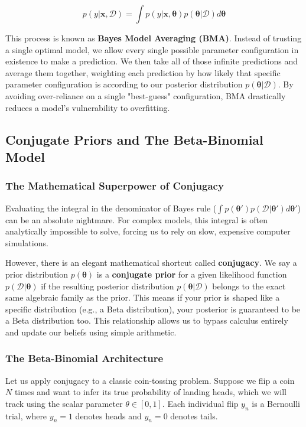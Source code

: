 \documentclass{article}
\begin{document}
\begin{equation}
p(y|\mathbf{x}, \mathcal{D}) = \int p(y|\mathbf{x}, \boldsymbol{\theta})p(\boldsymbol{\theta}|\mathcal{D})d\boldsymbol{\theta}
\end{equation}

This process is known as \textbf{Bayes Model Averaging (BMA)}. Instead of trusting a single optimal model, we allow every single possible parameter configuration in existence to make a prediction. We then take all of those infinite predictions and average them together, weighting each prediction by how likely that specific parameter configuration is according to our posterior distribution $p(\boldsymbol{\theta}|\mathcal{D})$. By avoiding over-reliance on a single "best-guess" configuration, BMA drastically reduces a model's vulnerability to overfitting.

\subsection{Conjugate Priors and The Beta-Binomial Model}

\subsubsection{The Mathematical Superpower of Conjugacy}
Evaluating the integral in the denominator of Bayes rule ($\int p(\boldsymbol{\theta}')p(\mathcal{D}|\boldsymbol{\theta}')d\boldsymbol{\theta}'$) can be an absolute nightmare. For complex models, this integral is often analytically impossible to solve, forcing us to rely on slow, expensive computer simulations.

However, there is an elegant mathematical shortcut called \textbf{conjugacy}. We say a prior distribution $p(\boldsymbol{\theta})$ is a \textbf{conjugate prior} for a given likelihood function $p(\mathcal{D}|\boldsymbol{\theta})$ if the resulting posterior distribution $p(\boldsymbol{\theta}|\mathcal{D})$ belongs to the exact same algebraic family as the prior. This means if your prior is shaped like a specific distribution (e.g., a Beta distribution), your posterior is guaranteed to be a Beta distribution too. This relationship allows us to bypass calculus entirely and update our beliefs using simple arithmetic.

\subsubsection{The Beta-Binomial Architecture}
Let us apply conjugacy to a classic coin-tossing problem. Suppose we flip a coin $N$ times and want to infer its true probability of landing heads, which we will track using the scalar parameter $\theta \in [0, 1]$. Each individual flip $y_n$ is a Bernoulli trial, where $y_n = 1$ denotes heads and $y_n = 0$ denotes tails.
\end{document}
